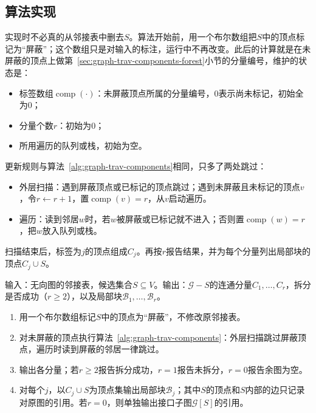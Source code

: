 \subsection{算法实现}
\label{sec:graph-trav-separator-implementation}

实现时不必真的从邻接表中删去$S$。算法开始前，用一个布尔数组把$S$中的顶点标记为“屏蔽”；这个数组只是对输入的标注，运行中不再改变。此后的计算就是在未屏蔽的顶点上做第~\ref{sec:graph-trav-components-forest}小节的分量编号，维护的状态是：
\begin{itemize}
  \item 标签数组$\operatorname{comp}(\cdot)$：未屏蔽顶点所属的分量编号，$0$表示尚未标记，初始全为$0$；
  \item 分量个数$r$：初始为$0$；
  \item 所用遍历的队列或栈，初始为空。
\end{itemize}
更新规则与算法~\ref{alg:graph-trav-components}相同，只多了两处跳过：
\begin{itemize}
  \item 外层扫描：遇到屏蔽顶点或已标记的顶点跳过；遇到未屏蔽且未标记的顶点$v$，令$r\gets r+1$，置$\operatorname{comp}(v)=r$，从$v$启动遍历。
  \item 遍历：读到邻居$w$时，若$w$被屏蔽或已标记就不进入；否则置$\operatorname{comp}(w)=r$，把$w$放入队列或栈。
\end{itemize}
扫描结束后，标签为$j$的顶点组成$C_j$。再按$r$报告结果，并为每个分量列出局部块的顶点$C_j\cup S$。

\begin{algorithm}[删除候选集后的分量与局部块]
\label{alg:graph-trav-separator-components}
输入：无向图的邻接表，候选集合$S\subseteq V$。输出：$\mathcal G-S$的连通分量$C_1,\ldots,C_r$，拆分是否成功（$r\geq2$），以及局部块$\mathcal B_1,\ldots,\mathcal B_r$。
\begin{enumerate}
  \item 用一个布尔数组标记$S$中的顶点为“屏蔽”，不修改原邻接表。
  \item 对未屏蔽的顶点执行算法~\ref{alg:graph-trav-components}：外层扫描跳过屏蔽顶点，遍历时读到屏蔽的邻居一律跳过。
  \item 输出各分量；若$r\geq2$报告拆分成功，$r=1$报告未拆分，$r=0$报告余图为空。
  \item 对每个$j$，以$C_j\cup S$为顶点集输出局部块$\mathcal B_j$；其中$S$的顶点和$S$内部的边只记录对原图的引用。若$r=0$，则单独输出接口子图$\mathcal G[S]$的引用。
\end{enumerate}
\end{algorithm}

